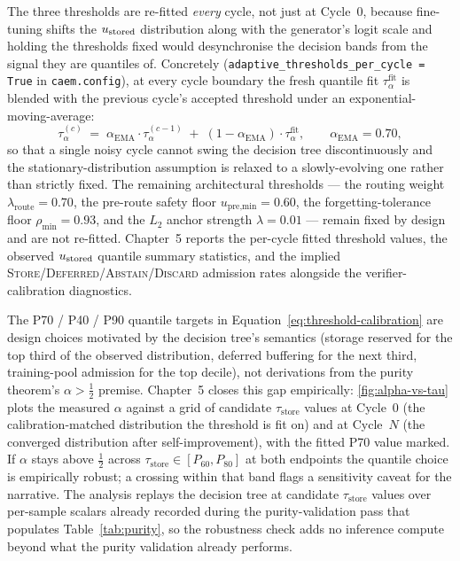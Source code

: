 The three thresholds are re-fitted \emph{every} cycle, not just at Cycle~0, because fine-tuning shifts the $u_{\text{stored}}$ distribution along with the generator's logit scale and holding the thresholds fixed would desynchronise the decision bands from the signal they are quantiles of. Concretely (\texttt{adaptive\_thresholds\_per\_cycle = True} in \texttt{caem.config}), at every cycle boundary the fresh quantile fit $\tau_{\alpha}^{\text{fit}}$ is blended with the previous cycle's accepted threshold under an exponential-moving-average:
\[
\tau_{\alpha}^{(c)} \;=\; \alpha_{\text{EMA}} \cdot \tau_{\alpha}^{(c-1)} \;+\; (1 - \alpha_{\text{EMA}}) \cdot \tau_{\alpha}^{\text{fit}}, \qquad \alpha_{\text{EMA}} = 0.70,
\]
so that a single noisy cycle cannot swing the decision tree discontinuously and the stationary-distribution assumption is relaxed to a slowly-evolving one rather than strictly fixed. The remaining architectural thresholds --- the routing weight $\lambda_{\text{route}} = 0.70$, the pre-route safety floor $u_{\text{pre,min}} = 0.60$, the forgetting-tolerance floor $\rho_{\min} = 0.93$, and the $L_{2}$ anchor strength $\lambda = 0.01$ --- remain fixed by design and are not re-fitted. Chapter~5 reports the per-cycle fitted threshold values, the observed $u_{\text{stored}}$ quantile summary statistics, and the implied \textsc{Store}/\textsc{Deferred}/\textsc{Abstain}/\textsc{Discard} admission rates alongside the verifier-calibration diagnostics.

The P70 / P40 / P90 quantile targets in
Equation~\ref{eq:threshold-calibration} are design choices motivated
by the decision tree's semantics (storage reserved for the top third
of the observed distribution, deferred buffering for the next third,
training-pool admission for the top decile), not derivations from the
purity theorem's $\alpha > \tfrac{1}{2}$ premise. Chapter~5 closes
this gap empirically: \cref{fig:alpha-vs-tau} plots the measured
$\alpha$ against a grid of candidate $\tau_{\text{store}}$ values at
Cycle~0 (the calibration-matched distribution the threshold is fit on)
and at Cycle~$N$ (the converged distribution after self-improvement),
with the fitted P70 value marked. If $\alpha$ stays above
$\tfrac{1}{2}$ across $\tau_{\text{store}} \in [P_{60}, P_{80}]$ at
both endpoints the quantile choice is empirically robust; a crossing
within that band flags a sensitivity caveat for the narrative. The
analysis replays the decision tree at candidate $\tau_{\text{store}}$
values over per-sample scalars already recorded during the
purity-validation pass that populates Table~\ref{tab:purity}, so the
robustness check adds no inference compute beyond what the purity
validation already performs.

